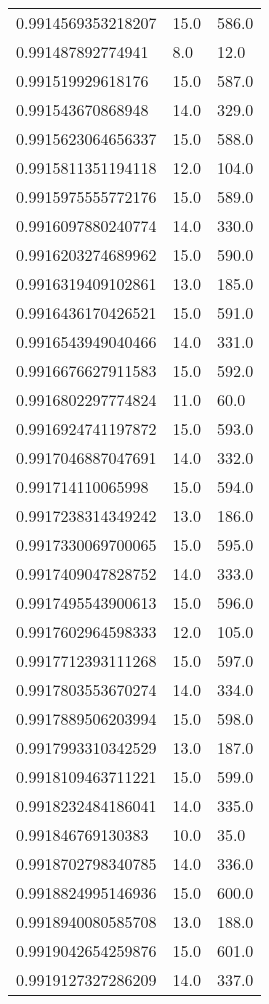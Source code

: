 \begin{center}
\begin{supertabular}[H]{p{0.30\textwidth}p{0.05\textwidth}p{0.05\textwidth}}
0.9914569353218207 & 15.0 & 586.0 \\ 
0.991487892774941 & 8.0 & 12.0 \\ 
0.991519929618176 & 15.0 & 587.0 \\ 
0.991543670868948 & 14.0 & 329.0 \\ 
0.9915623064656337 & 15.0 & 588.0 \\ 
0.9915811351194118 & 12.0 & 104.0 \\ 
0.9915975555772176 & 15.0 & 589.0 \\ 
0.9916097880240774 & 14.0 & 330.0 \\ 
0.9916203274689962 & 15.0 & 590.0 \\ 
0.9916319409102861 & 13.0 & 185.0 \\ 
0.9916436170426521 & 15.0 & 591.0 \\ 
0.9916543949040466 & 14.0 & 331.0 \\ 
0.9916676627911583 & 15.0 & 592.0 \\ 
0.9916802297774824 & 11.0 & 60.0 \\ 
0.9916924741197872 & 15.0 & 593.0 \\ 
0.9917046887047691 & 14.0 & 332.0 \\ 
0.991714110065998 & 15.0 & 594.0 \\ 
0.9917238314349242 & 13.0 & 186.0 \\ 
0.9917330069700065 & 15.0 & 595.0 \\ 
0.9917409047828752 & 14.0 & 333.0 \\ 
0.9917495543900613 & 15.0 & 596.0 \\ 
0.9917602964598333 & 12.0 & 105.0 \\ 
0.9917712393111268 & 15.0 & 597.0 \\ 
0.9917803553670274 & 14.0 & 334.0 \\ 
0.9917889506203994 & 15.0 & 598.0 \\ 
0.9917993310342529 & 13.0 & 187.0 \\ 
0.9918109463711221 & 15.0 & 599.0 \\ 
0.9918232484186041 & 14.0 & 335.0 \\ 
0.991846769130383 & 10.0 & 35.0 \\ 
0.9918702798340785 & 14.0 & 336.0 \\ 
0.9918824995146936 & 15.0 & 600.0 \\ 
0.9918940080585708 & 13.0 & 188.0 \\ 
0.9919042654259876 & 15.0 & 601.0 \\ 
0.9919127327286209 & 14.0 & 337.0 \\ 

\end{supertabular}
\end{center}
